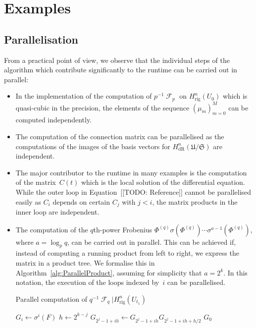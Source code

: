 \documentclass[a4paper,11pt]{article}
\numberwithin{equation}{section}
\DeclareMathOperator{\Frob}{\mathcal{F}} %
\providecommand{\HdR}{H_{\text{dR}}}    %
\providecommand{\Hrig}{H_{\text{rig}}}  %
\theoremstyle{definition}
\begin{document}

\section{Examples}
\label{sec:Examples}

\subsection{Parallelisation}

From a practical point of view, we observe that the individual steps 
of the algorithm which contribute significantly to the runtime can be 
carried out in parallel:
\begin{itemize}
\item In the implementation of the computation of $p^{-1} \Frob_p$ 
      on $\Hrig^{n}(U_0)$ which is quasi-cubic in the precision, 
      the elements of the sequence $(\mu_m)_{m=0}^{M}$ can be computed 
      independently.
\item The computation of the connection matrix can be parallelised 
      as the computations of the images of the basis vectors for 
      $\HdR^{n}(\mathfrak{U}/\mathfrak{S})$ are independent.
\item The major contributor to the runtime in many examples is the 
      computation of the matrix~$C(t)$ which is the local solution 
      of the differential equation.  While the outer loop in 
      Equation~[[TODO: Reference]] cannot be parallelised easily 
      as $C_{i}$ depends on certain $C_{j}$ with $j < i$, the 
      matrix products in the inner loop are independent.
\item The computation of the $q$th-power Frobenius 
      $\Phi^{(q)} \sigma(\Phi^{(q)}) \dotsm \sigma^{a-1}(\Phi^{(q)})$, 
      where $a = \log_{p} q$, can be carried out in parallel.  This can 
      be achieved if, instead of computing a running product from left to 
      right, we express the matrix in a product tree.  We formalise this in 
      Algorithm~\ref{alg:ParallelProduct}, assuming for simplicity 
      that $a = 2^k$.  In this notation, the execution of the 
      loops indexed by~$i$ can be parallelised.
      \begin{algorithm}
      \caption{Parallel computation of $q^{-1} \Frob_{q} | \Hrig^{n}(U_{t_1})$}
      \label{alg:ParallelProduct}
      \begin{algorithmic}
      \vspace{1mm}
          \State $G_i \gets \sigma^{i}(F)$
      \EndFor
          \State $h \gets 2^{k-j}$
          \State $G_{2^j-1 + ih} \gets G_{2^j-1 + i h} G_{2^j-1 + ih + h/2}$
          \EndFor
      \EndFor
      \Return $G_0$
      \end{algorithmic}
      \end{algorithm}
\end{itemize}




\end{document}
